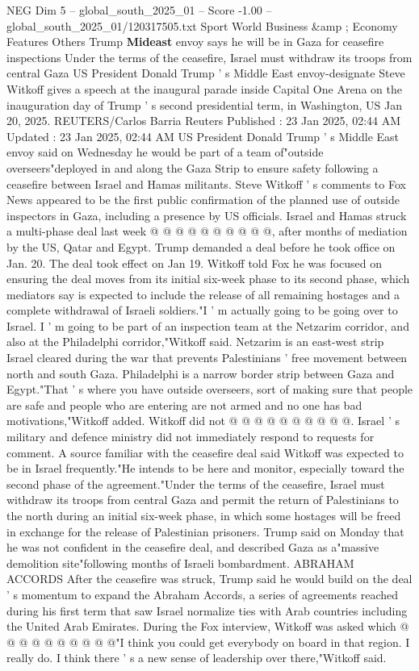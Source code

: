 \begin{textsample}{NEG Dim 5 – global\_south\_2025\_01 – Score -1.00 – global\_south\_2025\_01/120317505.txt}  \label{ex:f5_neg_105}
Sport World Business \&amp ; Economy Features Others Trump \textbf{Mideast} envoy says he will be in Gaza for ceasefire inspections Under the terms of the ceasefire, Israel must withdraw its troops from central Gaza US President Donald Trump ' s Middle East envoy-designate Steve Witkoff gives a speech at the inaugural parade inside Capital One Arena on the inauguration day of Trump ' s second presidential term, in Washington, US Jan 20, 2025.
REUTERS/Carlos Barria Reuters Published : 23 Jan 2025, 02:44 AM Updated : 23 Jan 2025, 02:44 AM US President Donald Trump ' s Middle East envoy said on Wednesday he would be part of a team of"outside overseers"deployed in and along the Gaza Strip to ensure safety following a ceasefire between Israel and Hamas militants.
Steve Witkoff ' s comments to Fox News appeared to be the first public confirmation of the planned use of outside inspectors in Gaza, including a presence by US officials.
Israel and Hamas struck a multi-phase deal last week @ @ @ @ @ @ @ @ @ @, after months of mediation by the US, Qatar and Egypt.
Trump demanded a deal before he took office on Jan. 20.
The deal took effect on Jan 19.
Witkoff told Fox he was focused on ensuring the deal moves from its initial six-week phase to its second phase, which mediators say is expected to include the release of all remaining hostages and a complete withdrawal of Israeli soldiers."I ' m actually going to be going over to Israel.
I ' m going to be part of an inspection team at the Netzarim corridor, and also at the Philadelphi corridor,"Witkoff said.
Netzarim is an east-west strip Israel cleared during the war that prevents Palestinians ' free movement between north and south Gaza.
Philadelphi is a narrow border strip between Gaza and Egypt."That ' s where you have outside overseers, sort of making sure that people are safe and people who are entering are not armed and no one has bad motivations,"Witkoff added.
Witkoff did not @ @ @ @ @ @ @ @ @ @.
Israel ' s military and defence ministry did not immediately respond to requests for comment.
A source familiar with the ceasefire deal said Witkoff was expected to be in Israel frequently."He intends to be here and monitor, especially toward the second phase of the agreement."Under the terms of the ceasefire, Israel must withdraw its troops from central Gaza and permit the return of Palestinians to the north during an initial six-week phase, in which some hostages will be freed in exchange for the release of Palestinian prisoners.
Trump said on Monday that he was not confident in the ceasefire deal, and described Gaza as a"massive demolition site"following months of Israeli bombardment.
ABRAHAM ACCORDS After the ceasefire was struck, Trump said he would build on the deal ' s momentum to expand the Abraham Accords, a series of agreements reached during his first term that saw Israel normalize ties with Arab countries including the United Arab Emirates.
During the Fox interview, Witkoff was asked which @ @ @ @ @ @ @ @ @ @"I think you could get everybody on board in that region.
I really do.
I think there ' s a new sense of leadership over there,"Witkoff said.

\end{textsample}
